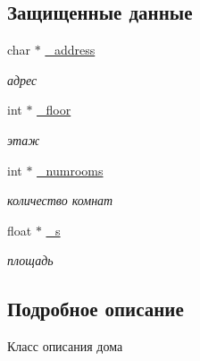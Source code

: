 \subsection*{Защищенные данные}
\begin{DoxyCompactItemize}
\item 
\hypertarget{class_polozkova___class___house_af6acda7baad7e5b1faa21d1d5b6d566e}{char $\ast$ \hyperlink{class_polozkova___class___house_af6acda7baad7e5b1faa21d1d5b6d566e}{\+\_\+address}}\label{class_polozkova___class___house_af6acda7baad7e5b1faa21d1d5b6d566e}

\begin{DoxyCompactList}\small\item\em адрес \end{DoxyCompactList}\item 
\hypertarget{class_polozkova___class___house_a0a0c81b50a0f8edf206e8614bdbe6dde}{int $\ast$ \hyperlink{class_polozkova___class___house_a0a0c81b50a0f8edf206e8614bdbe6dde}{\+\_\+floor}}\label{class_polozkova___class___house_a0a0c81b50a0f8edf206e8614bdbe6dde}

\begin{DoxyCompactList}\small\item\em этаж \end{DoxyCompactList}\item 
\hypertarget{class_polozkova___class___house_ad1007a9cd63dca94a2f5407040405c70}{int $\ast$ \hyperlink{class_polozkova___class___house_ad1007a9cd63dca94a2f5407040405c70}{\+\_\+numrooms}}\label{class_polozkova___class___house_ad1007a9cd63dca94a2f5407040405c70}

\begin{DoxyCompactList}\small\item\em количество комнат \end{DoxyCompactList}\item 
\hypertarget{class_polozkova___class___house_a18b88c0f7b928aae042a52abe8549bca}{float $\ast$ \hyperlink{class_polozkova___class___house_a18b88c0f7b928aae042a52abe8549bca}{\+\_\+s}}\label{class_polozkova___class___house_a18b88c0f7b928aae042a52abe8549bca}

\begin{DoxyCompactList}\small\item\em площадь \end{DoxyCompactList}\end{DoxyCompactItemize}


\subsection{Подробное описание}
Класс описания дома 

